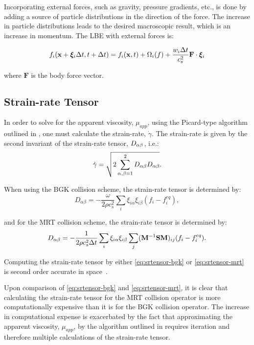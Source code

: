 Incorporating external forces, such as gravity, pressure gradients, etc., is done by adding a source of particle distributions in the direction of the force.
The increase in particle distributions leads to the desired macroscopic result, which is an increase in momentum.
The LBE with external forces is:

\begin{equation}
f_i(\mathbf{x} + \boldsymbol{\xi}_i \Delta t, t + \Delta t) = f_i(\mathbf{x}, t) + \Omega_i(f) + \frac{w_i \Delta t}{c_s^2} \mathbf{F} \cdot \boldsymbol{\xi}_i
\end{equation}

\noindent where $\mathbf{F}$ is the body force vector.

\subsection{Strain-rate Tensor}

In order to solve for the apparent viscosity, $\mu_{app}$, using the Picard-type algorithm outlined in , one must calculate the strain-rate, $\dot{\gamma}$.
The strain-rate is given by the second invariant of the strain-rate tensor, $D_{\alpha\beta}$, i.e.:
\begin{equation} \label{eq:second-invariant}
\dot{\gamma} = \sqrt{2 \sum_{\alpha,\beta=1}^{2} D_{\alpha\beta} D_{\alpha\beta}}.
\end{equation}

\noindent When using the BGK collision scheme, the strain-rate tensor is determined by:
\begin{equation} \label{eq:srtensor-bgk}
D_{\alpha \beta} = -\frac{\omega}{2 \rho c_s^2} \sum_i \xi_{i \alpha} \xi_{i \beta} (f_i - f^{eq}_i),
\end{equation} %

\noindent and for the MRT collision scheme, the strain-rate tensor is determined by:
\begin{equation} \label{eq:srtensor-mrt}
D_{\alpha \beta} = -\frac{1}{2 \rho c_s^2 \Delta t} \sum_i \xi_{i \alpha} \xi_{i \beta} \sum_j (\mathbf{M}^{-1} \mathbf{S} \mathbf{M})_{ij}(f_i - f^{eq}_i).
\end{equation} %

\noindent Computing the strain-rate tensor by either \eqref{eq:srtensor-bgk} or \eqref{eq:srtensor-mrt} is second order accurate in space~\cite{kruger2009shear,kruger2010second}.

Upon comparison of \eqref{eq:srtensor-bgk} and \eqref{eq:srtensor-mrt}, it is clear that calculating the strain-rate tensor for the MRT collision operator is more computationally expensive than it is for the BGK collision operator.
The increase in computational expense is exacerbated by the fact that approximating the apparent viscosity, $\mu_{app}$, by the algorithm outlined in  requires iteration and therefore multiple calculations of the strain-rate tensor.

